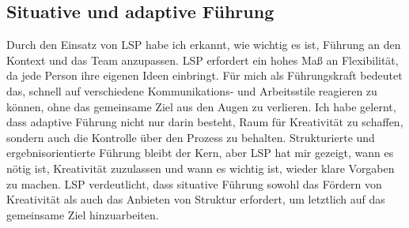 \subsection{Situative und adaptive Führung}
Durch den Einsatz von LSP habe ich erkannt, wie wichtig es ist, Führung an den Kontext und das Team anzupassen. LSP erfordert ein hohes Maß an Flexibilität, da jede Person ihre eigenen Ideen einbringt. Für mich als Führungskraft bedeutet das, schnell auf verschiedene Kommunikations- und Arbeitsstile reagieren zu können, ohne das gemeinsame Ziel aus den Augen zu verlieren.
Ich habe gelernt, dass adaptive Führung nicht nur darin besteht, Raum für Kreativität zu schaffen, sondern auch die Kontrolle über den Prozess zu behalten. Strukturierte und ergebnisorientierte Führung bleibt der Kern, aber LSP hat mir gezeigt, wann es nötig ist, Kreativität zuzulassen und wann es wichtig ist, wieder klare Vorgaben zu machen.
LSP verdeutlicht, dass situative Führung sowohl das Fördern von Kreativität als auch das Anbieten von Struktur erfordert, um letztlich auf das gemeinsame Ziel hinzuarbeiten.
\newpage